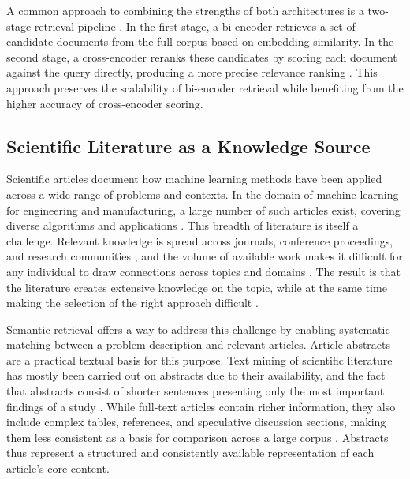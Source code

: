 A common approach to combining the strengths of both architectures 
is a two-stage retrieval pipeline 
\parencite{nogueira2019passage_re_ranking_with_bert}. In the first 
stage, a bi-encoder retrieves a set of candidate documents from 
the full corpus based on embedding similarity. In the second stage, 
a cross-encoder reranks these candidates by scoring each document 
against the query directly, producing a more precise relevance 
ranking \parencite{nogueira2019passage_re_ranking_with_bert}. This 
approach preserves the scalability of bi-encoder retrieval while 
benefiting from the higher accuracy of cross-encoder scoring.

\subsection{Scientific Literature as a Knowledge Source}

Scientific articles document how machine learning methods have 
been applied across a wide range of problems and contexts. In 
the domain of machine learning for engineering and manufacturing, 
a large number of such articles exist, covering diverse algorithms 
and applications \parencite{sala2018selecting_ml_algorithm}. 
This breadth of literature is itself a challenge. Relevant 
knowledge is spread across journals, conference proceedings, and 
research communities \parencite{adekoya2022applications_ai_em}, 
and the volume of available work makes it difficult for any 
individual to draw connections across topics and domains 
\parencite{olivetti2020data_driven_materials_research_enabled_natural_language_processing_information_extraction}. 
The result is that the literature creates extensive knowledge on 
the topic, while at the same time making
the selection of the right approach difficult
\parencite{sala2018selecting_ml_algorithm}.

Semantic retrieval offers a way to address this challenge by 
enabling systematic matching between a problem description and relevant articles. 
Article abstracts are a practical textual basis for this purpose. 
Text mining of scientific literature has mostly been carried out 
on abstracts due to their availability, and the fact that abstracts 
consist of shorter sentences presenting only the most 
important findings of a study 
\parencite{westergaard2018comprehensive_quantitative_comparison_text_mining_15_million_full_text_articles_versus_corresponding_abstracts}. 
While full-text articles contain richer information, they also 
include complex tables, references, and speculative discussion 
sections, making them less consistent as a basis for comparison 
across a large corpus 
\parencite{westergaard2018comprehensive_quantitative_comparison_text_mining_15_million_full_text_articles_versus_corresponding_abstracts}. 
Abstracts thus represent a structured and consistently available 
representation of each article's core content.

